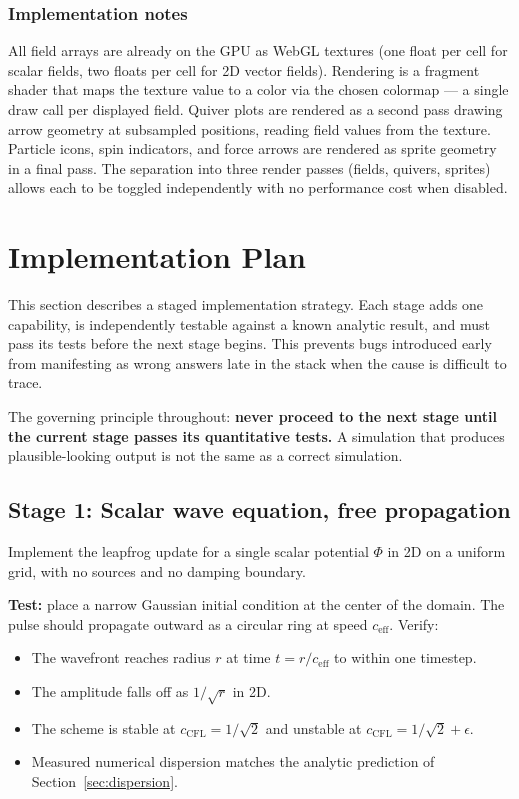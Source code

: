 \documentclass[11pt,a4paper]{article}
\begin{document}
\subsubsection*{Implementation notes}

All field arrays are already on the GPU as WebGL textures (one float per cell for scalar fields, two floats per cell for 2D vector fields).  Rendering is a fragment shader that maps the texture value to a color via the chosen colormap --- a single draw call per displayed field.  Quiver plots are rendered as a second pass drawing arrow geometry at subsampled positions, reading field values from the texture.  Particle icons, spin indicators, and force arrows are rendered as sprite geometry in a final pass.  The separation into three render passes (fields, quivers, sprites) allows each to be toggled independently with no performance cost when disabled.

\section{Implementation Plan}
\label{sec:impl}

This section describes a staged implementation strategy.  Each stage adds one capability, is independently testable against a known analytic result, and must pass its tests before the next stage begins.  This prevents bugs introduced early from manifesting as wrong answers late in the stack when the cause is difficult to trace.

The governing principle throughout: \textbf{never proceed to the next stage until the current stage passes its quantitative tests.}  A simulation that produces plausible-looking output is not the same as a correct simulation.

\subsection{Stage 1: Scalar wave equation, free propagation}

Implement the leapfrog update for a single scalar potential $\Phi$ in 2D on a uniform grid, with no sources and no damping boundary.

\textbf{Test:} place a narrow Gaussian initial condition at the center of the domain.  The pulse should propagate outward as a circular ring at speed $c_{\mathrm{eff}}$.  Verify:
\begin{itemize}
  \item The wavefront reaches radius $r$ at time $t = r/c_{\mathrm{eff}}$ to within one timestep.
  \item The amplitude falls off as $1/\sqrt{r}$ in 2D.
  \item The scheme is stable at $c_{\mathrm{CFL}} = 1/\sqrt{2}$ and unstable at $c_{\mathrm{CFL}} = 1/\sqrt{2} + \epsilon$.
  \item Measured numerical dispersion matches the analytic prediction of Section~\ref{sec:dispersion}.
\end{itemize}
\end{document}
